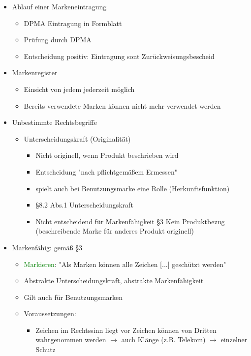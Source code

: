 \documentclass{report}
\begin{document}
\begin{itemize}
	\item Ablauf einer Markeneintragung
	\begin{itemize}
		\item DPMA Eintragung in Formblatt
		\item Prüfung durch DPMA
		\item Entscheidung positiv: Eintragung
		\newline sont Zurückweisungsbescheid
	\end{itemize}
	\item Markenregister
	\begin{itemize}
		\item Einsicht von jedem jederzeit möglich
		\item Bereits verwendete Marken können nicht mehr verwendet werden
	\end{itemize}
	\item Unbestimmte Rechtsbegriffe
	\begin{itemize}
		\item Unterscheidungskraft (Originalität)
		\begin{itemize}
			\item Nicht originell, wenn Produkt beschrieben wird
			\item Entscheidung "nach pflichtgemäßem Ermessen"
			\item spielt auch bei Benutzungsmarke eine Rolle (Herkunftsfunktion)
			\item §8.2 Abs.1 Unterscheidungskraft
			\item Nicht entscheidend für Markenfähigkeit §3
			\newline Kein Produktbezug (beschreibende Marke für anderes Produkt originell)
		\end{itemize}
	\end{itemize}
	\item Markenfähig: gemäß §3
	\begin{itemize}
		\item \textcolor{green}{Markieren}: "Als Marken können alle Zeichen [...] geschützt werden"
		\item Abstrakte Unterscheidungskraft, abstrakte Markenfähigkeit
		\item Gilt auch für Benutzungsmarken
		\item Voraussetzungen:
		\begin{itemize}
			\item Zeichen im Rechtssinn liegt vor
			\newline Zeichen können von Dritten wahrgenommen werden $\rightarrow$ auch Klänge (z.B. Telekom) $\rightarrow$ einzelner Schutz

\end{itemize}
\end{itemize}
\end{itemize}
\end{document}
